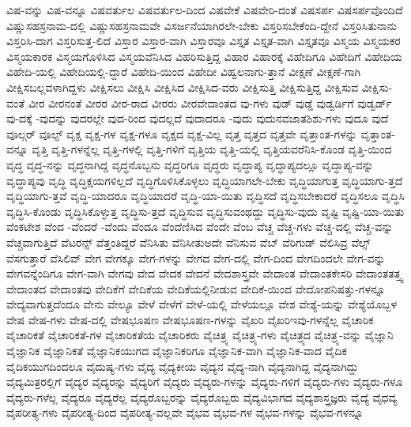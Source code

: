 {ವಿಷ-ವನ್ನು
ವಿಷ-ವನ್ನೂ
ವಿಷವರ್ತುಲ
ವಿಷವರ್ತುಲ-ದಿಂದ
ವಿಷವೇಕೆ
ವಿಷವೇರಿ-ದಂತೆ
ವಿಷಸರ್ಪ
ವಿಷಸರ್ಪವೊಂದಿದೆ
ವಿಷ್ಣುಸಹಸ್ರನಾಮ-ದಲ್ಲಿ
ವಿಷ್ಣುಸಹಸ್ರನಾಮವೇ
ವಿಸರ್ಜನೆಯಾಗಿರಲೇ-ಬೇಕು
ವಿಸ್ತರಿಸಬೇಕೆಂದಿ-ದ್ದೇನೆ
ವಿಸ್ತರಿಸಿತುನಾನು
ವಿಸ್ತರಿಸಿ-ದಾಗ
ವಿಸ್ತರಿಸುತ್ತ-ಲಿದೆ
ವಿಸ್ತಾರ
ವಿಸ್ತಾರ-ವಾಗಿ
ವಿಸ್ತಾರವೂ
ವಿಸ್ತೃತ
ವಿಸ್ತೃತ-ವಾಗಿ
ವಿಸ್ತೃತವೂ
ವಿಸ್ಮಯ
ವಿಸ್ಮಯಕರ
ವಿಸ್ಮಯಕಾರಕ
ವಿಸ್ಮಯಗೊಳಿಸಿದ
ವಿಸ್ಮಯವೆನಿಸಿದ
ವಿಹರಿಸುತ್ತಿದ್ದ
ವಿಹಾರ
ವಿಹಾರಕ್ಕೆ
ವಿಹೇದಿಗೂ
ವಿಹೇದಿಗೆ
ವಿಹೇದಿಯ
ವಿಹೇದಿ-ಯಲ್ಲಿ
ವಿಹೇದಿಯಲ್ಲಿ-ದ್ದಾರೆ
ವಿಹೇದಿ-ಯಿಂದ
ವಿಹೇದೀ
ವಿಹ್ವಲನಾಗು-ತ್ತಾನೆ
ವೀಕ್ಷಣೆ
ವೀಕ್ಷಣೆ-ಗಾಗಿ
ವೀಕ್ಷಿಸಬಲ್ಲವಳಾಗಿದ್ದಳು
ವೀಕ್ಷಿಸಲು
ವೀಕ್ಷಿಸಿ
ವೀಕ್ಷಿಸಿದ
ವೀಕ್ಷಿಸಿದ-ವರು
ವೀಕ್ಷಿಸುತ್ತಿ
ವೀಕ್ಷಿಸುತ್ತಿದ್ದ
ವೀಕ್ಷಿಸುವ
ವೀಕ್ಷಿಸು-ವಂತೆ
ವೀರ
ವೀರನಂತೆ
ವೀರರ
ವೀರ-ರಾದ
ವೀರರು
ವೀರವೇದಾಂತದ
ವು-ಗಳು
ವುಡ್
ವುಡ್ಡೆ
ವುಡ್ವರ್ಡಿಗೆ
ವುಡ್ವರ್ಡ್
ವು-ದಕ್ಕೆ
-ವುದನ್ನು
ವುದರಲ್ಲೇ
ವುದ-ರಿಂದ
ವುದಲ್ಲದೆ
ವುದಾದರೂ
-ವುದು
ವುದುನವಜಾತಶಿಶು-ಗಳು
ವುದೂ
ವುದೆ
ವೂಲ್ಗರ್
ವೂಲ್ಫ್
ವೃಕ್ಷ
ವೃಕ್ಷ-ಗಳ
ವೃಕ್ಷ-ಗಳೂ
ವೃಕ್ಷದ
ವೃಕ್ಷ-ವಿಲ್ಲ
ವೃತ್ತ
ವೃತ್ತದ
ವೃತ್ತವೇ
ವೃತ್ತಾಂತ-ಗಳನ್ನು
ವೃತ್ತಾಂತ-ವನ್ನೂ
ವೃತ್ತಿ
ವೃತ್ತಿ-ಗಳನ್ನೆಲ್ಲ
ವೃತ್ತಿ-ಗಳಲ್ಲಿ
ವೃತ್ತಿ-ಗಳಿಗೆ
ವೃತ್ತಿಯ
ವೃತ್ತಿ-ಯಲ್ಲಿ
ವೃತ್ತಿಯವರೆನಿಸಿ-ಕೊಂಡ
ವೃತ್ತಿ-ಯಿಂದ
ವೃದ್ಧ
ವೃದ್ಧ-ನನ್ನು
ವೃದ್ಧನಾಗಿದ್ದ
ವೃದ್ಧನೊಬ್ಬನು
ವೃದ್ಧರಿಗೂ
ವೃದ್ಧರು
ವೃದ್ಧಾಪ್ಯ
ವೃದ್ಧಾಪ್ಯದಲ್ಲೂ
ವೃದ್ಧಾಪ್ಯ-ವನ್ನು
ವೃದ್ಧಾಪ್ಯವು
ವೃದ್ಧಿ
ವೃದ್ಧಿಕ್ಷಯಗಳಿಲ್ಲದೆ
ವೃದ್ಧಿಗೊಳಿಸಿಕೊಳ್ಳಲು
ವೃದ್ಧಿಯಾಗಲೇ-ಬೇಕು
ವೃದ್ಧಿಯಾಗುತ್ತ
ವೃದ್ಧಿಯಾಗು-ತ್ತದೆ
ವೃದ್ಧಿಯಾಗು-ತ್ತವೆ
ವೃದ್ಧಿ-ಯಾದರೂ
ವೃದ್ಧಿಯಾದರೆ
ವೃದ್ಧಿ-ಯಾ-ಯಿತು
ವೃದ್ಧಿಸದೆ
ವೃದ್ಧಿಸಬೇಕಾದರೆ
ವೃದ್ಧಿಸಲೂ
ವೃದ್ಧಿಸಿ
ವೃದ್ಧಿಸಿ-ಕೊಂಡು
ವೃದ್ಧಿಸಿಕೊಳ್ಳುತ್ತ
ವೃದ್ಧಿಸು-ತ್ತದೆ
ವೃದ್ಧಿಸುವ
ವೃದ್ಧಿಸುವಂಥದ್ದು
ವೃದ್ಧಿಸು-ವುದು
ವೃಷ್ಟಿ
ವೃಷ್ಟಿ-ಯಾ-ಯಿತು
ವೆಂಕಟೇಶ
ವೆಂದ
-ವೆಂದರೆ
-ವೆಂದು
ವೆಂದೂ
ವೆಂದೆಣಿಸಿದ
ವೆಂದೇ
ವೆಂಬ
ವೆಚ್ಚ
ವೆಚ್ಚ-ಗಳು
ವೆಚ್ಚ-ದಲ್ಲಿ
ವೆಚ್ಚ-ವನ್ನು
ವೆಚ್ಚವಾಗುತ್ತಿದೆ
ವೆಟರನ್ಸ್
ವೆತ್ತಂತಿದ್ದರೆ
ವೆನಿಸಿತು
ವೆನಿಸೀತುಅದೇ
ವೆನಿಸುವ
ವೆಬ್
ವೆರಿಗುಡ್
ವೆಲಿಸಿವ್ರ
ವೆಲ್ಸ್
ವೆಸಗುತ್ತಾರೆ
ವೆಸಿಲಿವ್
ವೇಗ
ವೇಗಕ್ಕೂ
ವೇಗ-ಗಳನ್ನು
ವೇಗದ
ವೇಗ-ದಲ್ಲಿ
ವೇಗ-ದಿಂದ
ವೇಗದಿಂದಲೇ
ವೇಗ-ವನ್ನು
ವೇಗವನ್ನೆಂದಿಗೂ
ವೇಗ-ವಾಗಿ
ವೇಗವು
ವೇದ
ವೇದಕ
ವೇದನೆ
ವೇದಶಾಸ್ತ್ರವೇ
ವೇದಾಂತ
ವೇದಾಂತಕೇಸರಿ
ವೇದಾಂತತತ್ತ್ವ
ವೇದಾಂತದ
ವೇದಾಂತವು
ವೇದಿಕೆಗೆ
ವೇದಿಕೆಯ
ವೇದಿಕೆಯಲ್ಲಿನೀಡುವ
ವೇದಿಕೆ-ಯಿಂದ
ವೇದೋಪನಿಷತ್ತು-ಗಳನ್ನೂ
ವೇದ್ಯವಾಗುತ್ತದೆಂದೂ
ವೇನು
ವೇಲ್ಯೂ
ವೇಳೆ
ವೇಳೆಗೆ
ವೇಳೆ-ಯಲ್ಲಿ
ವೇಳೆಯಲ್ಲೂ
ವೇಶ
ವೇಶ್ಯೆ-ಯನ್ನು
ವೇಶ್ಯೆಯೊಬ್ಬಳ
ವೇಷ
ವೇಷ-ಗಳು
ವೇಷ-ದಲ್ಲಿ
ವೇಷಭೂಷಣ
ವೇಷಭೂಷಣ-ಗಳನ್ನು
ವೈಖರಿ
ವೈಖರಿಇವು-ಗಳನ್ನೆಲ್ಲ
ವೈಚಾರಿಕ
ವೈಚಾರಿಕತೆ
ವೈಚಾರಿಕತೆ-ಗಳ
ವೈಚಾರಿಕತೆಯ
ವೈಚಾರಿಕರು
ವೈಚಿತ್ರ್ಯ
ವೈಚಿತ್ರ್ಯ-ಗಳು
ವೈಚಿತ್ರ್ಯದ
ವೈಚಿತ್ರ್ಯ-ವನ್ನು
ವೈಜ್ಞಾನಿ
ವೈಜ್ಞಾನಿಕ
ವೈಜ್ಞಾನಿಕತೆ
ವೈಜ್ಞಾನಿಕಯುಗದ
ವೈಜ್ಞಾನಿಕರಿಗೂ
ವೈಜ್ಞಾನಿಕ-ವಾಗಿ
ವೈಜ್ಞಾನಿಕ-ವಾದ
ವೈದಿಕ
ವೈದಿಕಯುಗದಿಂದಲೂ
ವೈದುಷ್ಯ-ಗಳು
ವೈದ್ಯ
ವೈದ್ಯಕೀಯ
ವೈದ್ಯನ
ವೈದ್ಯ-ನಾಗಿ
ವೈದ್ಯನಾಗಿದ್ದ
ವೈದ್ಯನಾಗಿದ್ದು
ವೈದ್ಯಮಿತ್ರರಲ್ಲಿಗೆ
ವೈದ್ಯರ
ವೈದ್ಯರನ್ನು
ವೈದ್ಯರಿಗೆ
ವೈದ್ಯರು
ವೈದ್ಯರು-ಗಳನ್ನು
ವೈದ್ಯರು-ಗಳಿಗೆ
ವೈದ್ಯರು-ಗಳು
ವೈದ್ಯರು-ಗಳೂ
ವೈದ್ಯರು-ಗಳೆಲ್ಲ
ವೈದ್ಯರೂ
ವೈದ್ಯರೆಲ್ಲ
ವೈದ್ಯರೊಬ್ಬರನ್ನು
ವೈದ್ಯರೊಬ್ಬರು
ವೈದ್ಯವಿಭಾಗದ
ವೈದ್ಯಶಾಸ್ತ್ರಜ್ಞರು
ವೈದ್ಯೆ
ವೈಧವ್ಯ
ವೈಪರೀತ್ಯ-ಗಳು
ವೈಪರೀತ್ಯ-ದಿಂದ
ವೈಪರೀತ್ಯ-ವಲ್ಲವೇ
ವೈಭವ
ವೈಭವ-ಗಳ
ವೈಭವ-ಗಳನ್ನು
ವೈಭವ-ಗಳನ್ನೂ
}
